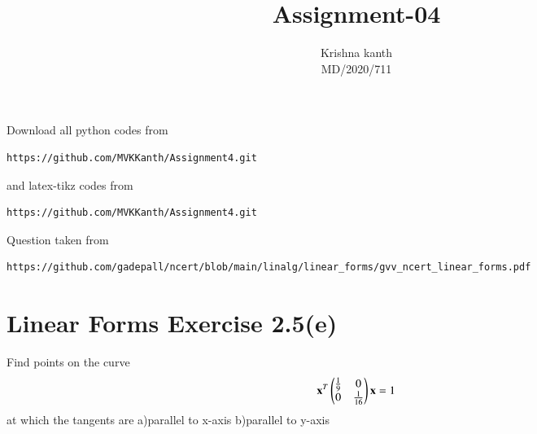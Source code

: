 \documentclass[journal,12pt,twocolumn]{IEEEtran}
\begin{document}
\def\rightbox#1{\makebox[0in][r]{#1}}
\def\centbox#1{\makebox[0in]{#1}}
\def\topbox#1{\raisebox{-\baselineskip}[0in][0in]{#1}}
\def\midbox#1{\raisebox{-0.5\baselineskip}[0in][0in]{#1}}
\vspace{3cm}
\title{Assignment-04}
\author{Krishna kanth\\MD/2020/711}
\maketitle
\newpage
\bigskip
\renewcommand{\thefigure}{\theenumi}
\renewcommand{\thetable}{\theenumi}
Download all python codes from
\begin{lstlisting}
https://github.com/MVKKanth/Assignment4.git
\end{lstlisting}
%
and latex-tikz codes from
%
\begin{lstlisting}
https://github.com/MVKKanth/Assignment4.git
\end{lstlisting}
%
Question taken from
\begin{lstlisting}
https://github.com/gadepall/ncert/blob/main/linalg/linear_forms/gvv_ncert_linear_forms.pdf
\end{lstlisting}
\section{Linear Forms Exercise 2.5(e)}
Find points on the curve 
\begin{align}
\mathbf{x}^T\begin{pmatrix}\frac{1}{9} & 0 \\ 0 & \frac{1}{16}\end{pmatrix}\mathbf{x} = 1 \label{quad/79/2.0.1}
\end{align}
at which the tangents are 
a)parallel to x-axis
b)parallel to y-axis
\end{document}
